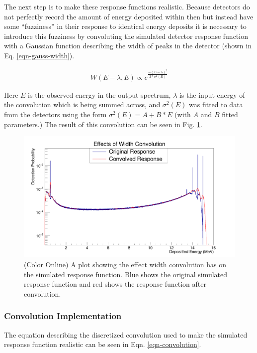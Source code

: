 \documentclass[5p]{elsarticle}
\begin{document}
The next step is to make these response functions realistic. Because detectors do not perfectly record the amount of energy deposited within then but instead have some ``fuzziness'' in their response to identical energy deposits it is necessary to introduce this fuzziness by convoluting the simulated detector response function with a Gaussian function describing the width of peaks in the detector (shown in Eq. \ref{eqn-gauss-width}).

\begin{align}
W(E-\lambda{}, E) \propto e^{\frac{-(E-\lambda{})^2}{2*\sigma{}^2(E)}}
\label{eqn-gauss-width}
\end{align}

Here $E$ is the observed energy in the output spectrum, $\lambda{}$ is the input energy of the convolution which is being summed across, and $\sigma{}^2(E)$ was fitted to data from the detectors using the form $\sigma{}^2(E) = A + B*E$ (with $A$ and $B$ fitted parameters.) The result of this convolution can be seen in Fig. \ref{fig-convol-effect}.

\begin{figure}[h]
\begin{center}
\includegraphics[width=\linewidth]{convolve_diff_png}
\caption{(Color Online) A plot showing the effect width convolution has on the simulated response function. Blue shows the original simulated response function and red shows the response function after convolution.}
\label{fig-convol-effect}
\end{center}
\end{figure}

\subsubsection{Convolution Implementation}
The equation describing the discretized convolution used to make the simulated response function realistic can be seen in Eqn. \ref{eqn-convolution}.
\end{document}
